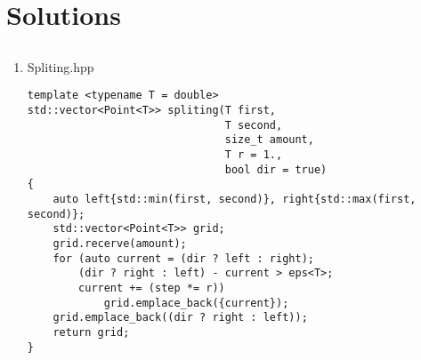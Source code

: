 \section{Solutions}

\subsection{}
\begin{enumerate}
	\item Spliting.hpp
	\begin{lstlisting}
template <typename T = double>
std::vector<Point<T>> spliting(T first,
							   T second,
							   size_t amount,
							   T r = 1.,
							   bool dir = true)
{
	auto left{std::min(first, second)}, right{std::max(first, second)};
	std::vector<Point<T>> grid;
	grid.recerve(amount);
	for (auto current = (dir ? left : right);
		(dir ? right : left) - current > eps<T>;
		current += (step *= r))
			grid.emplace_back({current});
    grid.emplace_back((dir ? right : left));
	return grid;
}
	\end{lstlisting}
\end{enumerate}

